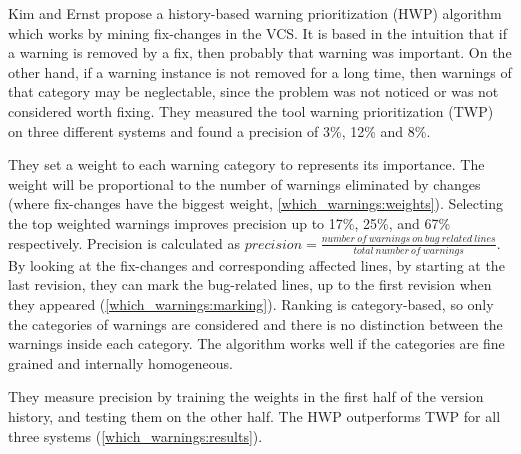  Kim and Ernst \cite{which_warnings} propose a history-based warning prioritization (HWP) algorithm which works by mining fix-changes in the VCS. It is based in the intuition that if a warning is removed by a fix, then probably that warning was important. On the other hand, if a warning instance is not removed for a long time, then warnings of
 that category may be neglectable, since the problem was not noticed or was not considered worth fixing. They measured the tool warning prioritization (TWP) on three different systems and found a precision of 3\%, 12\% and 8\%.  

 They set a weight to each warning category to represents its importance. The weight will be proportional to the number of warnings eliminated by changes (where fix-changes have the biggest weight, \cref{which_warnings:weights}). Selecting the top weighted warnings improves precision up to 17\%, 25\%, and 67\% respectively. Precision is calculated as $precision = \frac{number\:of \:warnings\:on\:bug\:related\:lines}{total\:number\:of\:warnings}$.
 By looking at the fix-changes and corresponding affected lines, by starting at the last revision, they can mark the bug-related lines, up to the first revision when they appeared (\cref{which_warnings:marking}). Ranking is category-based, so only the categories of warnings are considered and there is no distinction between the warnings inside each category. The algorithm works well if the categories are fine grained and internally homogeneous.

 They measure precision by training the weights in the first half of the version history, and testing them on the other half. The HWP outperforms TWP for all three systems (\cref{which_warnings:results}).

